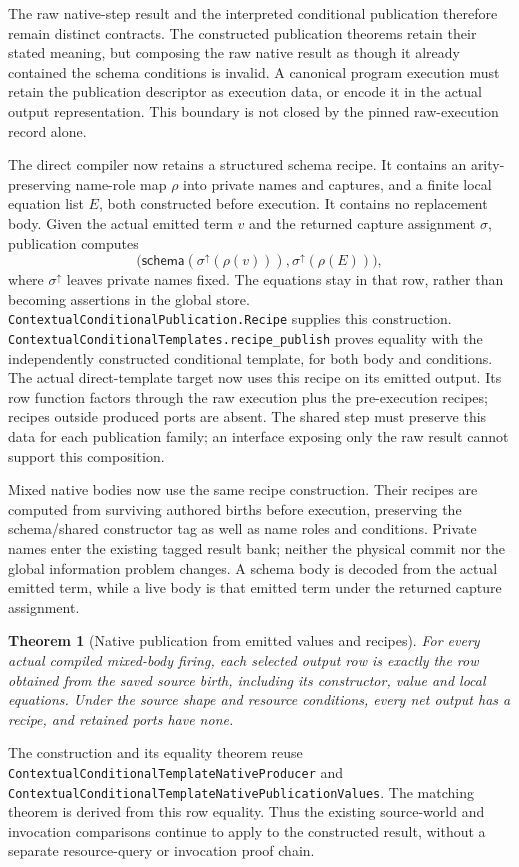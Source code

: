 \documentclass[11pt]{article}
\newtheorem{theorem}{Theorem}
\newcommand{\code}[1]{\texttt{\small #1}}
\begin{document}
The raw native-step result and the interpreted conditional publication
therefore remain distinct contracts. The constructed publication theorems
retain their stated meaning, but composing the raw native result as though
it already contained the schema conditions is invalid. A canonical program
execution must retain the publication descriptor as execution data, or
encode it in the actual output representation. This boundary is not closed
by the pinned raw-execution record alone.

The direct compiler now retains a structured schema recipe. It contains
an arity-preserving name-role map $\rho$ into private names and captures,
and a finite local equation list $E$, both constructed before execution.
It contains no replacement body. Given the actual emitted term $v$ and
the returned capture assignment $\sigma$, publication computes
\[
  \bigl(\mathsf{schema}(\sigma^{\uparrow}(\rho(v))),
         \sigma^{\uparrow}(\rho(E))\bigr),
\]
where $\sigma^{\uparrow}$ leaves private names fixed. The equations stay
in that row, rather than becoming assertions in the global store.
\code{ContextualConditionalPublication.Recipe} supplies this construction.
\code{ContextualConditionalTemplates.recipe\_publish} proves equality with
the independently constructed conditional template, for both body and
conditions. The actual direct-template target now uses this recipe on its
emitted output. Its row function factors through the raw execution plus
the pre-execution recipes; recipes outside produced ports are absent.
The shared step must preserve this data for each publication family; an
interface exposing only the raw result cannot support this composition.

Mixed native bodies now use the same recipe construction. Their recipes
are computed from surviving authored births before execution, preserving
the schema/shared constructor tag as well as name roles and conditions.
Private names enter the existing tagged result bank; neither the physical
commit nor the global information problem changes. A schema body is decoded
from the actual emitted term, while a live body is that emitted term under
the returned capture assignment.

\begin{theorem}[Native publication from emitted values and recipes]
For every actual compiled mixed-body firing, each selected output row is
exactly the row obtained from the saved source birth, including its
constructor, value and local equations. Under the source shape and resource
conditions, every net output has a recipe, and retained ports have none.
\end{theorem}
The construction and its equality theorem reuse
\code{ContextualConditionalTemplateNativeProducer} and
\code{ContextualConditionalTemplateNativePublicationValues}.
The matching theorem is derived from this row equality. Thus the existing
source-world and invocation comparisons continue to apply to the constructed
result, without a separate resource-query or invocation proof chain.
\end{document}
